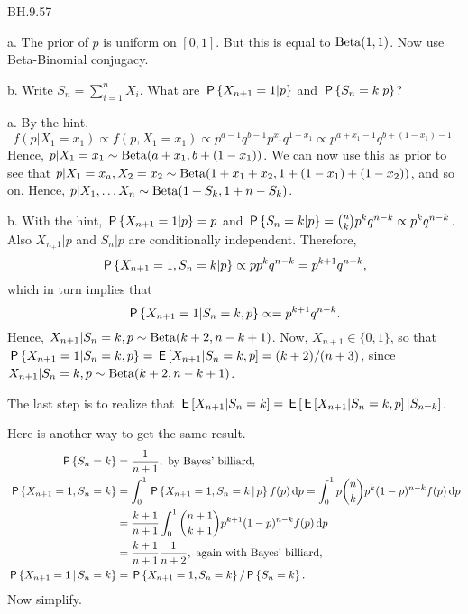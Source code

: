 \begin{exercise}
BH.9.57
\begin{hint}
a. The prior of $p$ is uniform on $[0,1]$. But this is equal to $\Beta{1,1}$. Now use  Beta-Binomial conjugacy.

b. Write $S_n=\sum_{i=1}^nX_{i}$. What are $\P{X_{n+1}=1|p}$ and $\P{S_n=k|p}$?
\end{hint}
\begin{solution}
a. By  the hint,
\begin{equation*}
f(p|X_1=x_{1}) \propto f(p, X_1=x_{1}) \propto
p^{a-1} q^{b-1} p^{x_1}q^{1-x_1}
\propto p^{a+x_1-1} q^{b+(1-x_{1})-1}.
\end{equation*}
Hence, $p|X_1=x_1 \sim \Beta{a+x_1, b+(1-x_{1})}$. We can now use this as prior to see that  $p|X_1=x_{a}, X_{2}=x_{2} \sim \Beta{1+x_1+x_2, 1+ (1-x_1) + (1-x_2)}$, and so on. Hence, $p|X_{1}, \ldots X_{n} \sim \Beta{1+S_k, 1+n-S_{k}}$.

b. With the hint, $\P{X_{n+1}=1|p} = p$ and $\P{S_n=k|p} ={n \choose k} p^{k}q^{n-k} \propto p^{k}q^{n-k}$. Also $X_{n_+1}|p$ and $S_n|p$ are conditionally independent.
Therefore,
\begin{equation*}
\P{X_{n+1}=1, S_n=k | p} \propto p p^kq^{n-k} = p^{k+1} q^{n-k},
\end{equation*}
which in turn implies that
\begin{equation*}
\P{X_{n+1}=1| S_n=k, p} \propto = p^{k+1} q^{n-k}.
\end{equation*}
Hence, $X_{n+1}| S_n=k, p \sim \Beta{k+2, n-k+1}$.
Now, $X_{n+1}\in \{0, 1\}$, so that $\P{X_{n+1}=1| S_n=k, p} = \E{X_{n+1}| S_n=k, p} = (k+2)/(n+3)$, since $X_{n+1}| S_n=k, p \sim \Beta{k+2, n-k+1}$.

The last step is to realize that $\E{X_{n+1}|S_{n}=k} = \E{\E{X_{n+1}|S_{n}=k, p}|S_{n=k}}$.

Here is another way to get the same result.
\begin{align*}
\P{S_n=k} &= \frac 1 {n+1},\text{ by Bayes' billiard}, \\
\P{X_{n+1}=1,S_n=k} &=  \int_0^1 \P{X_{n+1}=1,S_n=k\given p} f(p) \d p
= \int_0^1 p {n \choose k} p^{k} (1-p)^{n-k} f(p) \d p \\
&= \frac{k+1}{n+1}\int_0^1  {n+1 \choose k+1} p^{k+1} (1-p)^{n-k} f(p) \d p \\
&= \frac{k+1}{n+1} \frac 1 {n+2}, \text{ again with Bayes' billiard}, \\
\P{X_{n+1}=1 \given S_n=k} &= \P{X_{n+1}=1,S_n=k}/\P{S_{n}=k}.
\end{align*}
Now simplify.
\end{solution}
\end{exercise}

